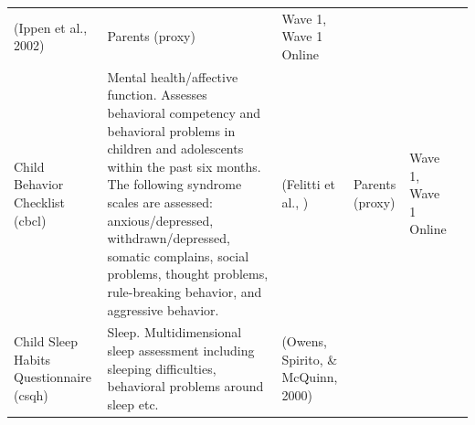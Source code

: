 \documentclass[]{book}
\begin{document}
\begin{longtable}[]{@{}llllll@{}}
\begin{minipage}[t]{0.15\columnwidth}
(Ippen et al., 2002)\strut
\end{minipage} & \begin{minipage}[t]{0.16\columnwidth}\raggedright
Parents (proxy)\strut
\end{minipage} & \begin{minipage}[t]{0.06\columnwidth}\raggedright
Wave 1, Wave 1 Online\strut
\end{minipage} & \begin{minipage}[t]{0.10\columnwidth}\raggedright
\strut
\end{minipage}\tabularnewline
\begin{minipage}[t]{0.18\columnwidth}\raggedright
Child Behavior Checklist (cbcl)\strut
\end{minipage} & \begin{minipage}[t]{0.18\columnwidth}\raggedright
Mental health/affective function. Assesses behavioral competency and behavioral problems in children and adolescents within the past six months. The following syndrome scales are assessed: anxious/depressed, withdrawn/depressed, somatic complains, social problems, thought problems, rule-breaking behavior, and aggressive behavior.\strut
\end{minipage} & \begin{minipage}[t]{0.15\columnwidth}\raggedright
(Felitti et al., )\strut
\end{minipage} & \begin{minipage}[t]{0.16\columnwidth}\raggedright
Parents (proxy)\strut
\end{minipage} & \begin{minipage}[t]{0.06\columnwidth}\raggedright
Wave 1, Wave 1 Online\strut
\end{minipage} & \begin{minipage}[t]{0.10\columnwidth}\raggedright
\strut
\end{minipage}\tabularnewline
\begin{minipage}[t]{0.18\columnwidth}\raggedright
Child Sleep Habits Questionnaire (csqh)\strut
\end{minipage} & \begin{minipage}[t]{0.18\columnwidth}\raggedright
Sleep. Multidimensional sleep assessment including sleeping difficulties, behavioral problems around sleep etc.\strut
\end{minipage} & \begin{minipage}[t]{0.15\columnwidth}\raggedright
(Owens, Spirito, \& McQuinn, 2000)\strut
\end{minipage} & \begin{minipage}[t]{0.16\columnwidth}\raggedright

\end{minipage}
\end{longtable}
\end{document}

